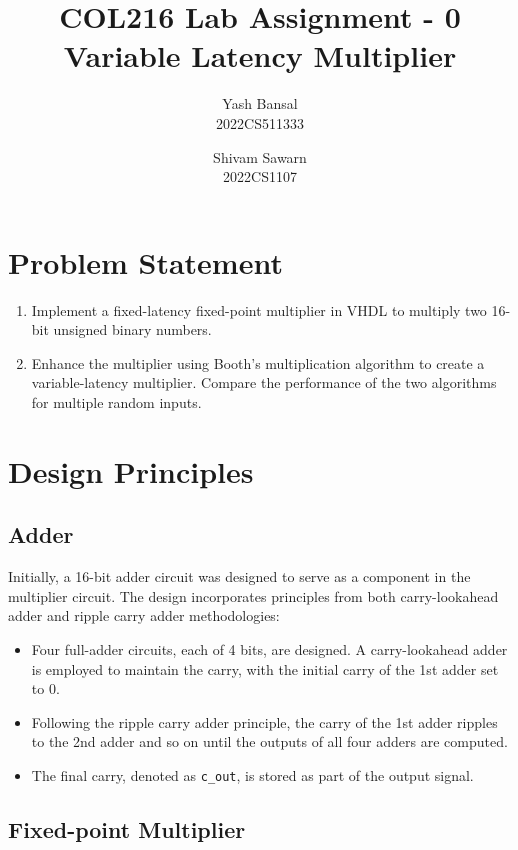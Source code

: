\documentclass[11pt]{article}
\title{{\fontsize{21pt}{18pt}\selectfont COL216 Lab Assignment - 0} \\ Variable Latency Multiplier}
\author{Yash Bansal \\ 2022CS511333 \and Shivam Sawarn \\ 2022CS1107}
\date{}
\begin{document}
\maketitle

\section{Problem Statement}

\begin{enumerate}
    \item Implement a fixed-latency fixed-point multiplier in VHDL to multiply two 16-bit unsigned binary numbers.
    \item Enhance the multiplier using Booth's multiplication algorithm to create a variable-latency multiplier. Compare the performance of the two algorithms for multiple random inputs.
\end{enumerate}

\section{Design Principles}

\subsection{Adder}

Initially, a 16-bit adder circuit was designed to serve as a component in the multiplier circuit. The design incorporates principles from both carry-lookahead adder and ripple carry adder methodologies:

\begin{itemize}
    \item Four full-adder circuits, each of 4 bits, are designed. A carry-lookahead adder is employed to maintain the carry, with the initial carry of the 1st adder set to 0.
    \item Following the ripple carry adder principle, the carry of the 1st adder ripples to the 2nd adder and so on until the outputs of all four adders are computed.
    \item The final carry, denoted as \texttt{c\_out}, is stored as part of the output signal.
\end{itemize}

\subsection{Fixed-point Multiplier}
\end{document}
